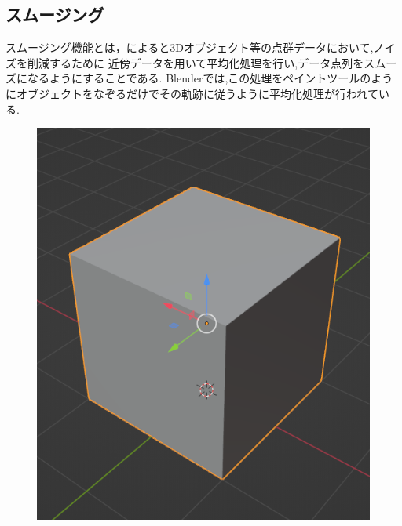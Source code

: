 \documentclass{ltjsreport}
\begin{document}
		\subsection{スムージング}
			スムージング機能とは，\cite{ref:7}によると3Dオブジェクト等の点群データにおいて,ノイズを削減するために
			近傍データを用いて平均化処理を行い,データ点列をスムーズになるようにすることである.
			Blenderでは,この処理をペイントツールのようにオブジェクトをなぞるだけでその軌跡に従うように平均化処理が行われている.
			\begin{figure}[H]
			\centering
			\begin{minipage}{0.4\columnwidth}
			\centering
			\includegraphics[width = \columnwidth]{../figs/SmoothingBeforCube.png}
			\end{minipage}
			\hspace{0.04\columnwidth}
			\begin{minipage}{0.4\columnwidth}
			\centering

\end{minipage}
\end{figure}
\end{document}
